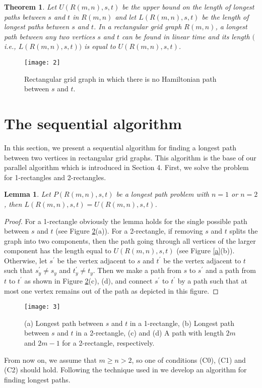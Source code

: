 \documentclass[preprint,12pt]{elsarticle}
\newtheorem{thm}{Theorem}[section]
\newtheorem{lem}{Lemma}[section]
\begin{document}
\begin{thm} \label{theorem:2}\cite{FAA:ALAFFLPIRGG} Let $U(R(m,n),s,t)$ be the upper bound on the length of
longest paths between $s$ and $t$ in $R(m,n)$ and let
$L(R(m,n),s,t)$ be the length of longest paths between $s$ and $t$.
In a rectangular grid graph $R(m,n)$, a longest path between any two
vertices $s$ and $t$ can be found in linear time and its length
$($i.e., $L(R(m,n),s,t))$ is equal to $U(R(m,n),s,t)$.
\end{thm}
\begin{figure}[tb]
  \centering
  \texttt{[image: 2]}
  \caption[]{\small Rectangular grid graph in which there is no Hamiltonian path between $s$ and $t$.}
  \label{RecFig}
\end{figure}

\section{\bf The sequential algorithm}
In this section, we present a sequential algorithm for finding a
longest path between two vertices in rectangular grid graphs. This
algorithm is the base of our parallel algorithm which is introduced
in Section 4. First, we solve the problem for 1-rectangles and
2-rectangles.
\begin{lem} \label{Lemma:5} \cite{FAA:ALAFFLPIRGG} Let $P(R(m,n),s,t)$ be a longest
path problem with $n=1$ or $n=2$, then
$L(R(m,n),s,t)=U(R(m,n),s,t)$.
\end{lem}
\begin{proof}
For a 1-rectangle obviously the lemma holds for the single possible
path between $s$ and $t$ (see Figure \ref{a3}(a)). For a
2-rectangle, if removing $s$ and $t$ splits the graph into two
components, then the path going through all vertices of the larger
component has the length equal to $U(R(m,n),s,t)$ (see Figure
\ref{a}(b)). Otherwise, let $s^{'}$ be the vertex adjacent to $s$
and $t^{'}$ be the vertex adjacent to $t$ such that $s^{'}_{y} \neq
s_{y}$  and $t^{'}_{y} \neq t_{y}$. Then we make a path from $s$ to
$s^{'}$ and a path from $t$ to $t^{'}$ as shown in Figure
\ref{a3}(c), (d), and connect $s^{'}$ to $t^{'}$ by a path such that
at most one vertex remains out of the path as depicted in this
figure.
\end{proof}
\begin{figure}[tb]
  \centering
  \texttt{[image: 3]}
  \caption[]{
 (a) Longest path between $s$ and $t$ in a 1-rectangle,
  (b) Longest path between $s$ and $t$ in a 2-rectangle,
  (c) and (d) A path with length $2m$ and $2m-1$ for a 2-rectangle, respectively.}
  \label{a3}
\end{figure}
From now on, we assume that $m\geq n> 2$, so one of conditions (C0),
(C1) and (C2) should hold. Following the technique used in
\cite{CST:AFAFCHPIM} we develop an algorithm for finding longest
paths.\\
\end{document}
